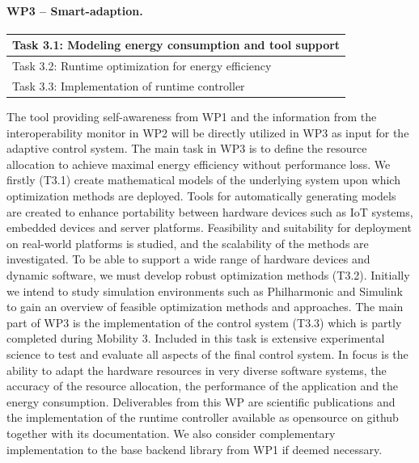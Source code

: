 \documentclass{article}
\begin{document}
\paragraph{WP3 -- Smart-adaption.}
\begin{table}
\vspace{-0.4cm}
\small
\begin{tabular}{ | l |}
\hline
Task 3.1: Modeling energy consumption and tool support\\ \hline
Task 3.2: Runtime optimization for energy efficiency \\ \hline
Task 3.3: Implementation of runtime controller \\ \hline
\end{tabular}
\vspace{-0.3cm}
\end{table}
The tool providing self-awareness from WP1 and the information from the interoperability monitor in WP2 will be directly utilized in WP3 as input for the adaptive control system.
The main task in WP3 is to define the resource allocation to achieve maximal energy efficiency without performance loss.
We firstly (T3.1) create mathematical models of the underlying system upon which optimization methods are deployed.
Tools for automatically generating models are created to enhance portability between hardware devices such as IoT systems, embedded devices and server platforms.
Feasibility and suitability for deployment on real-world platforms is studied, and the scalability of the methods are investigated.
To be able to support a wide range of hardware devices and dynamic software, we must develop robust optimization methods (T3.2).
Initially we intend to study simulation environments such as Philharmonic and Simulink to gain an overview of feasible optimization methods and approaches. 
The main part of WP3 is the implementation of the control system (T3.3) which is partly completed during Mobility 3.
Included in this task is extensive experimental science to test and evaluate all aspects of the final control system.
In focus is the ability to adapt the hardware resources in very diverse software systems, the accuracy of the resource allocation, the performance of the application and the energy consumption.
Deliverables from this WP are scientific publications and the implementation of the runtime controller available as opensource on github together with its documentation.
We also consider complementary implementation to the base backend library from WP1 if deemed necessary.
\end{document}
